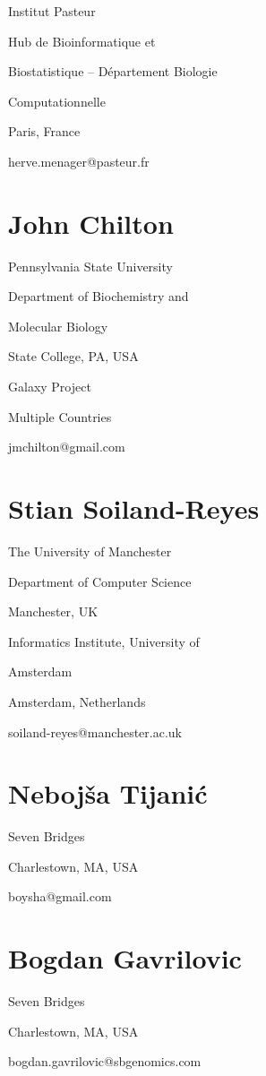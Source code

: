 \documentclass[
]{article}
\begin{document}
Institut Pasteur

Hub de Bioinformatique et

Biostatistique -- Département Biologie

Computationnelle

Paris, France

herve.menager@pasteur.fr

\section{John Chilton}\label{john-chilton}

Pennsylvania State University

Department of Biochemistry and

Molecular Biology

State College, PA, USA

Galaxy Project

Multiple Countries

jmchilton@gmail.com

\section{Stian Soiland-Reyes}\label{stian-soiland-reyes}

The University of Manchester

Department of Computer Science

Manchester, UK

Informatics Institute, University of

Amsterdam

Amsterdam, Netherlands

soiland-reyes@manchester.ac.uk

\section{Nebojša Tijanić}\label{nebojux161a-tijaniux107}

Seven Bridges

Charlestown, MA, USA

boysha@gmail.com

\section{Bogdan Gavrilovic}\label{bogdan-gavrilovic}

Seven Bridges

Charlestown, MA, USA

bogdan.gavrilovic@sbgenomics.com
\end{document}
